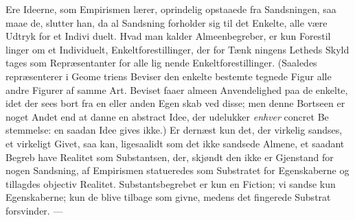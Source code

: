 \documentclass[12pt,a4paper]{book}
\begin{document}
Ere Ideerne, som Empirismen lærer, oprindelig opstaaede
fra Sandsningen, saa maae de, slutter han, da al Sandsning
forholder sig til det Enkelte, alle være Udtryk for et Indivi\-%
duelt. Hvad man kalder Almeenbegreber, er kun Forestil\-%
linger om et Individuelt, Enkeltforestillinger, der for Tænk\-%
ningens Letheds Skyld tages som Repræsentanter for alle lig\-%
nende Enkeltforestillinger. (Saaledes repræsenterer i Geome\-%
triens Beviser den enkelte bestemte tegnede Figur alle andre
Figurer af samme Art. Beviset faaer almeen Anvendelighed
paa de enkelte, idet der sees bort fra en eller anden Egen\-%
skab ved disse; men denne Bortseen er noget Andet end at
danne en abstract Idee, der udelukker \emph{enhver} concret Be\-%
stemmelse: en saadan Idee gives ikke.)
Er dernæst kun det, der virkelig sandses, et virkeligt
Givet, saa kan, ligesaalidt som det ikke sandsede Almene, et
saadant Begreb have Realitet som Substantsen, der, skjøndt
den ikke er Gjenstand for nogen Sandsning, af Empirismen
statueredes som Substratet for Egenskaberne og tillagdes
objectiv Realitet. Substantsbegrebet er kun en Fiction; vi
sandse kun Egenskaberne; kun de blive tilbage som givne,
medens det fingerede Substrat forsvinder. ---
\end{document}
